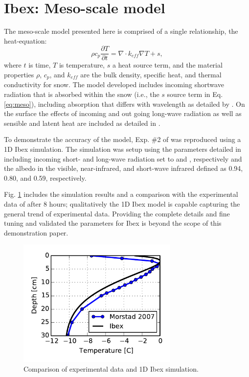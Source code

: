 \section{Ibex: Meso-scale model}\label{sec:ibex}
The meso-scale model presented here is comprised of a single relationship, the heat-equation:
\begin{equation}\label{eq:meso}
\rho c_p \frac{\partial{T}}{\partial t} = \nabla \cdot k_{eff} \nabla T + s,
\end{equation}
where $t$ is time, $T$ is temperature, $s$ a heat source term, and the material properties $\rho$, $c_p$, and $k_{eff}$ are the bulk density, specific heat, and thermal conductivity for snow. The model developed includes incoming shortwave radiation that is absorbed within the snow (i.e., the $s$ source term in Eq. \eqref{eq:meso}), including absorption that differs with wavelength as detailed by \citet[][Ch.4]{slaughter2010numerical}. On the surface the effects of incoming and out going long-wave radiation as well as sensible and latent heat are included as detailed in \citet{slaughter2010numerical}.

To demonstrate the accuracy of the model, Exp. \#2 of \citet{morstad2007experimental} was reproduced using a 1D Ibex simulation. The simulation was setup using the parameters detailed in \citet[][Ch.4]{slaughter2010numerical} including incoming short- and long-wave radiation set to  and , respectively and the albedo in the visible, near-infrared, and short-wave infrared defined as 0.94, 0.80, and 0.59, respectively.

Fig. \ref{fig:ibex_1d} includes the simulation results and a comparison with the experimental data of \citet{morstad2007experimental} after 8 hours; qualitatively the 1D Ibex model is capable capturing the general trend of experimental data. Providing the complete details and fine tuning and validated the parameters for Ibex is beyond the scope of this demonstration paper.

\begin{figure}[H]
  \includegraphics[width=3.125in]{figures/ibex.pdf}
  \caption{Comparison of experimental data and 1D Ibex simulation.}
  \label{fig:ibex_1d}
\end{figure}

